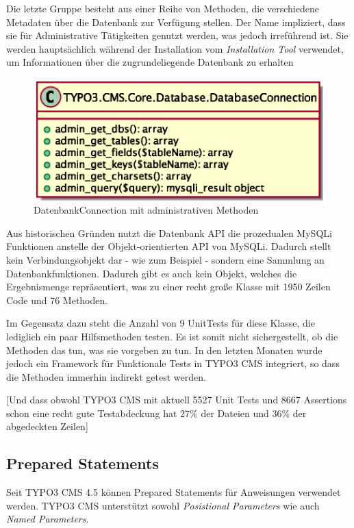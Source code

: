 Die letzte Gruppe besteht aus einer Reihe von Methoden, die verschiedene Metadaten über die Datenbank zur Verfügung stellen. Der Name impliziert, dass sie für Administrative Tätigkeiten genutzt werden, was jedoch irreführend ist. Sie werden hauptsächlich während der Installation vom \textit{Installation Tool} verwendet, um Informationen über die zugrundeliegende Datenbank zu erhalten

\begin{figure}[H]
\centering
\includegraphics[scale=0.7]{gfx/uml/DatabaseConnectionAdminMethods.eps}
\caption{DatenbankConnection mit administrativen Methoden}
\label{fig:databaseConnectionWithSQLAdminMethods}
\end{figure}

Aus historischen Gründen nutzt die Datenbank API die prozedualen MySQLi Funktionen anstelle der Objekt-orientierten API von MySQLi. Dadurch stellt\\  kein Verbindungsobjekt dar - wie zum Beispiel  - sondern eine Sammlung an Datenbankfunktionen. Dadurch gibt es auch kein Objekt, welches die Ergebnismenge repräsentiert, was  zu einer recht große Klasse mit 1950 Zeilen Code und 76 Methoden.

Im Gegensatz dazu steht die Anzahl von 9 UnitTests für diese Klasse, die lediglich ein paar Hilfsmethoden testen. Es ist somit nicht sichergestellt, ob die Methoden das tun, was sie vorgeben zu tun. In den letzten Monaten wurde jedoch ein Framework für Funktionale Tests in TYPO3 CMS integriert, so dass die Methoden immerhin indirekt getest werden.

[Und dass obwohl TYPO3 CMS mit aktuell 5527 Unit Tests und 8667 Assertions schon eine recht gute Testabdeckung hat 27\% der Dateien und 36\% der abgedeckten Zeilen]

\subsection{Prepared Statements}
\label{currentsituationsubsec:preparedStatements}
Seit TYPO3 CMS 4.5 können Prepared Statements für  Anweisungen verwendet werden. TYPO3 CMS unterstützt sowohl \textit{Posistional Parameters} wie auch \textit{Named Parameters}.

